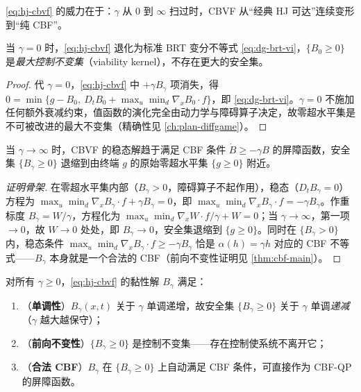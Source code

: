 \cref{eq:hj-cbvf} 的威力在于：$\gamma$ 从 $0$ 到 $\infty$ 扫过时，CBVF 从“经典 HJ 可达”连续变形到“纯 CBF”。

\begin{proposition}[$\gamma=0$ 恢复经典 HJ 可达]
\label{prop:hj-cbvf-zero}
当 $\gamma=0$ 时，\cref{eq:hj-cbvf} 退化为标准 BRT 变分不等式 \cref{eq:dg-brt-vi}，$\{B_0\ge0\}$ 是\emph{最大控制不变集}（viability kernel），不存在更大的安全集。
\end{proposition}

\begin{proof}
代 $\gamma=0$，\cref{eq:hj-cbvf} 中 $+\gamma B_\gamma$ 项消失，得 $0=\min\{g-B_0,\ D_tB_0+\max_u\min_d\nabla_xB_0\cdot f\}$，即 \cref{eq:dg-brt-vi}。$\gamma=0$ 不施加任何额外衰减约束，值函数的演化完全由动力学与障碍算子决定，故零超水平集是不可被改进的最大不变集（精确性见 \cref{ch:plan-diffgame}）。
\end{proof}

\begin{proposition}
\label{prop:hj-cbvf-inf}
当 $\gamma\to\infty$ 时，CBVF 的稳态解趋于满足 CBF 条件 $\dot B\ge-\gamma B$ 的屏障函数，安全集 $\{B_\gamma\ge0\}$ 退缩到由终端 $g$ 的原始零超水平集 $\{g\ge0\}$ 附近。
\end{proposition}

\begin{proof}[证明骨架]
在零超水平集内部（$B_\gamma>0$，障碍算子不起作用），稳态（$D_tB_\gamma=0$）方程为 $\max_u\min_d\nabla_xB_\gamma\cdot f+\gamma B_\gamma=0$，即 $\max_u\min_d\nabla_xB_\gamma\cdot f=-\gamma B_\gamma$。作重标度 $B_\gamma=W/\gamma$，方程化为 $\max_u\min_d\nabla_xW\cdot f/\gamma+W=0$；当 $\gamma\to\infty$，第一项 $\to0$，故 $W\to0$ 处处，即 $B_\gamma\to0$，安全集退缩到 $\{g\ge0\}$。同时在 $\{B_\gamma>0\}$ 内，稳态条件 $\max_u\min_d\nabla_xB_\gamma\cdot f\ge-\gamma B_\gamma$ 恰是 $\alpha(h)=\gamma h$ 对应的 CBF 不等式——$B_\gamma$ 本身就是一个合法的 CBF（前向不变性证明见 \cref{thm:cbf-main}）。
\end{proof}

\begin{theorem}
\label{thm:hj-cbvf}
对所有 $\gamma\ge0$，\cref{eq:hj-cbvf} 的黏性解 $B_\gamma$ 满足：
\begin{enumerate}
  \item（\textbf{单调性}）$B_\gamma(x,t)$ 关于 $\gamma$ 单调递增，故安全集 $\{B_\gamma\ge0\}$ 关于 $\gamma$ 单调\emph{递减}（$\gamma$ 越大越保守）；
  \item（\textbf{前向不变性}）$\{B_\gamma\ge0\}$ 是控制不变集——存在控制使系统不离开它；
  \item（\textbf{合法 CBF}）$B_\gamma$ 在 $\{B_\gamma\ge0\}$ 上自动满足 CBF 条件，可直接作为 CBF-QP 的屏障函数。
\end{enumerate}
\end{theorem}

